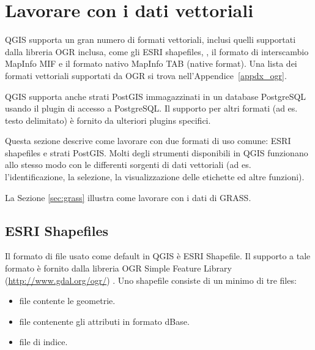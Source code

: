
\section{Lavorare con i dati vettoriali}\label{label_workingvector}



QGIS supporta un gran numero di formati vettoriali, inclusi quelli supportati
dalla libreria OGR inclusa, come gli ESRI shapefiles,
, il formato di
interscambio MapInfo MIF
e il formato nativo MapInfo TAB (native format).
Una lista dei formati vettoriali supportati da OGR si trova nell'Appendice~\ref{appdx_ogr}.

QGIS supporta anche strati PostGIS
immagazzinati in un database PostgreSQL usando il plugin di accesso a PostgreSQL.
Il supporto per altri formati (ad es. testo delimitato) è fornito da
ulteriori plugins specifici.

Questa sezione descrive come lavorare con due formati di uso comune:
ESRI shapefiles e strati PostGIS. Molti degli strumenti disponibili in QGIS
funzionano allo stesso modo con le differenti sorgenti di dati vettoriali (ad
es. l'identificazione, la selezione, la visualizzazione delle etichette ed
altre funzioni).

La Sezione \ref{sec:grass} illustra come lavorare con i dati di GRASS.

\subsection{ESRI Shapefiles}

Il formato di file usato come default in QGIS è ESRI Shapefile. Il supporto a
tale formato è fornito dalla libreria OGR Simple Feature Library (\url{http://www.gdal.org/ogr/})
. Uno shapefile consiste di un minimo di tre files:

\begin{itemize}
\item {} file contente le geometrie.
\item {} file contenente gli attributi in formato dBase.
\item {} file di indice.
\end{itemize}

